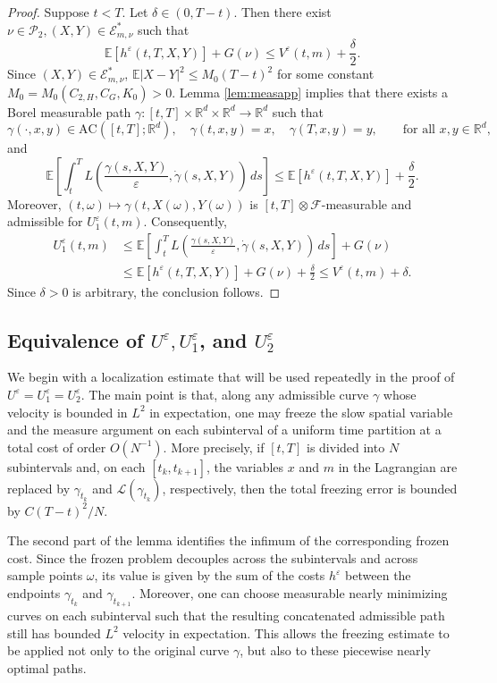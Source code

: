 \documentclass[reqno,11pt]{amsart}
\numberwithin{equation}{section}
\newcommand{\R}{\mathbb{R}} %
\newcommand{\e}{\varepsilon}
\begin{document}
\begin{proof}
Suppose $t<T$. Let $\delta \in \left(0, T- t\right)$. Then there exist $\nu \in \mathcal{P}_2, (X,Y)\in \mathcal{E}^\ast_{m,\nu}$ such that
\[
\mathbb{E}\left[h^\e\left(t, T, X, Y\right)\right]+G(\nu) \leq V^\e(t, m)+\frac{\delta}{2}.
\]
Since $(X,Y)\in \mathcal{E}^\ast_{m, \nu}$, $\mathbb{E}\left|X-Y\right|^2 \leq M_0 (T-t)^2$ for some constant $M_0=M_0(C_{2,H}, C_G, K_0)>0$. Lemma \ref{lem:measapp} implies that there exists a Borel measurable path $\gamma:[t,T]\times\mathbb{R}^d\times\mathbb{R}^d\to\mathbb{R}^d$ such that
\[
 \gamma(\cdot, x,y) \in \mathrm{AC}([t, T];\R^d), \quad  \gamma(t,x,y)=x, \quad \gamma(T,x,y)=y, \qquad \text{for all }x, y \in \R^d,
\]
and
\[
\mathbb{E}\left[\int_{t}^{T}
L \left(\frac{\gamma(s,X,Y)}{\varepsilon}, \dot{\gamma}(s,X,Y)\right)\,ds\right] \leq
\mathbb{E} \left[h^\e\left(t, T, X, Y\right)\right]+ \frac{\delta}{2}.
\]
Moreover, $(t,\omega) \mapsto \gamma(t,X(\omega),Y(\omega))$ is $[t,T]\otimes \mathcal{F}$-measurable and admissible for $U^\e_1(t, m)$. Consequently,
\[
\begin{aligned}
U^\e_1(t,m) &\leq \mathbb{E}\left[\int_{t}^{T}
L \left(\frac{\gamma(s,X,Y)}{\varepsilon}, \dot{\gamma}(s,X,Y)\right)\,ds\right]+G\left(\nu\right)\\
& \leq \mathbb{E} \left[h^\e\left(t, T, X, Y\right)\right] + G\left(\nu\right) +\frac{\delta}{2} \leq V^\e (t, m)+\delta.
\end{aligned}
\]
Since $\delta>0$ is arbitrary, the conclusion follows.
\end{proof}

\subsection{Equivalence of $U^\e, U^\e_1$, and $U^\e_2$}\label{equivalence}
We begin with a localization estimate that will be used repeatedly in the proof of $U^\e=U^\e_1=U^\e_2$. The main point is that, along any admissible curve $\gamma$ whose velocity is bounded in $L^2$ in expectation, one may freeze the slow spatial variable and the measure argument on each subinterval of a uniform time partition at a total cost of order $O(N^{-1})$. More precisely, if $[t,T]$ is divided into $N$ subintervals and, on each $[t_k,t_{k+1}]$, the variables $x$ and $m$ in the Lagrangian are replaced by $\gamma_{t_k}$ and $\mathcal L(\gamma_{t_k})$, respectively, then the total freezing error is bounded by $C(T-t)^2/N$.

The second part of the lemma identifies the infimum of the corresponding frozen cost. Since the frozen problem decouples across the subintervals and across sample points $\omega$, its value is given by the sum of the costs $h^\e$ between the endpoints $\gamma_{t_k}$ and $\gamma_{t_{k+1}}$. Moreover, one can choose measurable nearly minimizing curves on each subinterval such that the resulting concatenated admissible path still has bounded $L^2$ velocity in expectation. This allows the freezing estimate to be applied not only to the original curve $\gamma$, but also to these piecewise nearly optimal paths.
\end{document}
